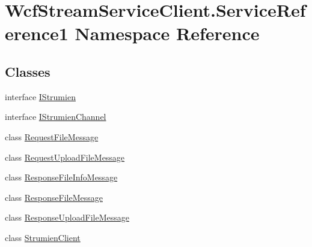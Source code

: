 \hypertarget{namespace_wcf_stream_service_client_1_1_service_reference1}{}\section{Wcf\+Stream\+Service\+Client.\+Service\+Reference1 Namespace Reference}
\label{namespace_wcf_stream_service_client_1_1_service_reference1}
\subsection*{Classes}
\begin{DoxyCompactItemize}
\item 
interface \hyperlink{interface_wcf_stream_service_client_1_1_service_reference1_1_1_i_strumien}{I\+Strumien}
\item 
interface \hyperlink{interface_wcf_stream_service_client_1_1_service_reference1_1_1_i_strumien_channel}{I\+Strumien\+Channel}
\item 
class \hyperlink{class_wcf_stream_service_client_1_1_service_reference1_1_1_request_file_message}{Request\+File\+Message}
\item 
class \hyperlink{class_wcf_stream_service_client_1_1_service_reference1_1_1_request_upload_file_message}{Request\+Upload\+File\+Message}
\item 
class \hyperlink{class_wcf_stream_service_client_1_1_service_reference1_1_1_response_file_info_message}{Response\+File\+Info\+Message}
\item 
class \hyperlink{class_wcf_stream_service_client_1_1_service_reference1_1_1_response_file_message}{Response\+File\+Message}
\item 
class \hyperlink{class_wcf_stream_service_client_1_1_service_reference1_1_1_response_upload_file_message}{Response\+Upload\+File\+Message}
\item 
class \hyperlink{class_wcf_stream_service_client_1_1_service_reference1_1_1_strumien_client}{Strumien\+Client}
\end{DoxyCompactItemize}
